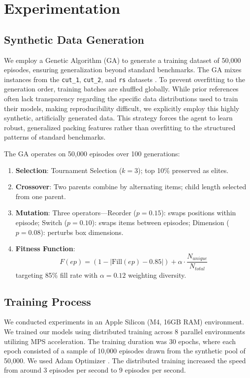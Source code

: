 \documentclass[runningheads]{llncs}
\begin{document}
\section{Experimentation}

\subsection{Synthetic Data Generation}
We employ a Genetic Algorithm (GA) to generate a training dataset of 50,000 episodes, ensuring generalization beyond standard benchmarks. The GA mixes instances from the \texttt{cut\_1}, \texttt{cut\_2}, and \texttt{rs} datasets \cite{zhao}. To prevent overfitting to the generation order, training batches are shuffled globally. While prior references often lack transparency regarding the specific data distributions used to train their models, making reproducibility difficult, we explicitly employ this highly synthetic, artificially generated data. This strategy forces the agent to learn robust, generalized packing features rather than overfitting to the structured patterns of standard benchmarks.

The GA operates on 50,000 episodes over 100 generations:
\begin{enumerate}
    \item \textbf{Selection}: Tournament Selection ($k=3$); top 10\% preserved as elites.
    \item \textbf{Crossover}: Two parents combine by alternating items; child length selected from one parent.
    \item \textbf{Mutation}: Three operators—Reorder ($p=0.15$): swaps positions within episode; Switch ($p=0.10$): swaps items between episodes; Dimension ($p=0.08$): perturbs box dimensions.
    \item \textbf{Fitness Function}:
    \begin{equation}
        F(ep) = \left( 1 - | \text{Fill}(ep) - 0.85 | \right) + \alpha \cdot \frac{N_{unique}}{N_{total}}
    \end{equation}
    targeting 85\% fill rate with $\alpha = 0.12$ weighting diversity.
\end{enumerate}

\subsection{Training Process}
We conducted experiments in an Apple Silicon (M4, 16GB RAM) environment. We trained our models using distributed training across 8 parallel environments \cite{baselines} utilizing MPS acceleration. The training duration was 30 epochs, where each epoch consisted of a sample of 10,000 episodes drawn from the synthetic pool of 50,000. We used Adam Optimizer \cite{kingma2017adammethodstochasticoptimization}. The distributed training increased the speed from around $3$ episodes per second to $9$ episodes per second.
\end{document}
